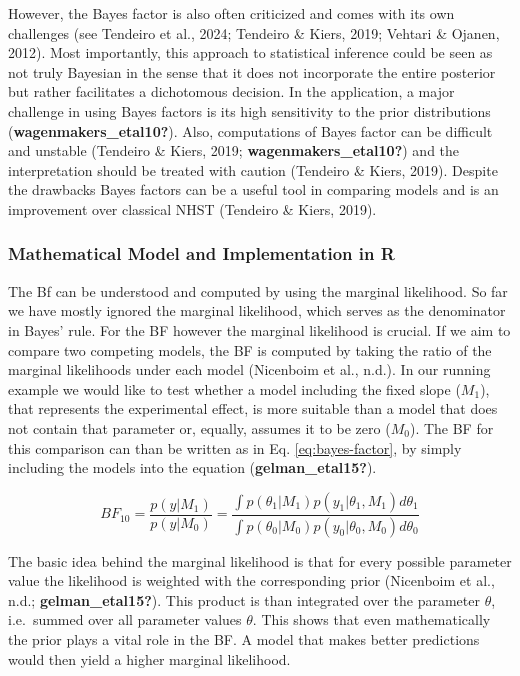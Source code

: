 \documentclass[
  doc,12pt,floatsintext]{apa7}
\begin{document}
However, the Bayes factor is also often criticized and comes with its own challenges (see Tendeiro et al., 2024; Tendeiro \& Kiers, 2019; Vehtari \& Ojanen, 2012). Most importantly, this approach to statistical inference could be seen as not truly Bayesian in the sense that it does not incorporate the entire posterior but rather facilitates a dichotomous decision. In the application, a major challenge in using Bayes factors is its high sensitivity to the prior distributions (\textbf{wagenmakers\_etal10?}). Also, computations of Bayes factor can be difficult and unstable (Tendeiro \& Kiers, 2019; \textbf{wagenmakers\_etal10?}) and the interpretation should be treated with caution (Tendeiro \& Kiers, 2019). Despite the drawbacks Bayes factors can be a useful tool in comparing models and is an improvement over classical NHST (Tendeiro \& Kiers, 2019).

\subsubsection{Mathematical Model and Implementation in R}\label{mathematical-model-and-implementation-in-r-2}

The Bf can be understood and computed by using the marginal likelihood. So far we have mostly ignored the marginal likelihood, which serves as the denominator in Bayes' rule. For the BF however the marginal likelihood is crucial. If we aim to compare two competing models, the BF is computed by taking the ratio of the marginal likelihoods under each model (Nicenboim et al., n.d.). In our running example we would like to test whether a model including the fixed slope (\(M_1\)), that represents the experimental effect, is more suitable than a model that does not contain that parameter or, equally, assumes it to be zero (\(M_0\)). The BF for this comparison can than be written as in Eq. \eqref{eq:bayes-factor}, by simply including the models into the equation (\textbf{gelman\_etal15?}).

\begin{equation}
BF_{10} = \frac{p(y|M_1)}{p(y|M_0)} = \frac{\int{p(\theta_1|M_1)p(y_1|\theta_1,M_1)}d\theta_1}{\int{p(\theta_0|M_0)p(y_0|\theta_0,M_0)}d\theta_0}
\label{eq:bayes-factor}
\end{equation}

The basic idea behind the marginal likelihood is that for every possible parameter value the likelihood is weighted with the corresponding prior (Nicenboim et al., n.d.; \textbf{gelman\_etal15?}). This product is than integrated over the parameter \(\theta\), i.e.~summed over all parameter values \(\theta\). This shows that even mathematically the prior plays a vital role in the BF. A model that makes better predictions would then yield a higher marginal likelihood.
\end{document}
